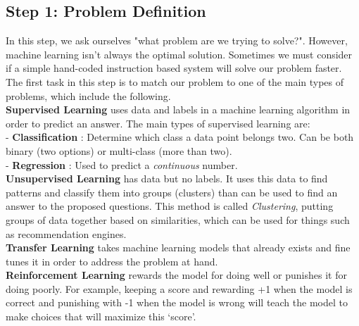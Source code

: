 \documentclass[11pt, a4paper]{article}
\begin{document}
\begin{spacing}{1.1}
	\subsection{Step 1: Problem Definition}
	In this step, we ask ourselves "what problem are we trying to solve?". However, machine learning isn't always the optimal solution. Sometimes we must consider if a simple hand-coded instruction based system will solve our problem faster. The first task in this step is to match our problem to one of the main types of problems, which include the following. \vspace*{1mm} \\
	\textbf{Supervised Learning} uses data and labels in a machine learning algorithm in order to predict an answer. The main types of supervised learning are: \\
	\hspace*{2mm} - \textbf{Classification} : Determine which class a data point belongs two. Can be both binary (two options) \hspace*{34mm} or multi-class (more than two). \\
	\hspace*{2mm} - \textbf{Regression} : Used to predict a \textit{continuous} number. \vspace*{2mm} \\
	\textbf{Unsupervised Learning} has data but no labels. It uses this data to find patterns and classify them into groups (clusters) than can be used to find an answer to the proposed questions. This method is called \textit{Clustering}, putting groups of data together based on similarities, which can be used for things such as recommendation engines. \vspace*{2mm} \\
	\textbf{Transfer Learning} takes machine learning models that already exists and fine tunes it in order to address the problem at hand. \vspace*{2mm} \\
	\textbf{Reinforcement Learning} rewards the model for doing well or punishes it for doing poorly. For example, keeping a score and rewarding +1 when the model is correct and punishing with -1 when the model is wrong will teach the model to make choices that will maximize this `score'.

\end{spacing}
\end{document}
